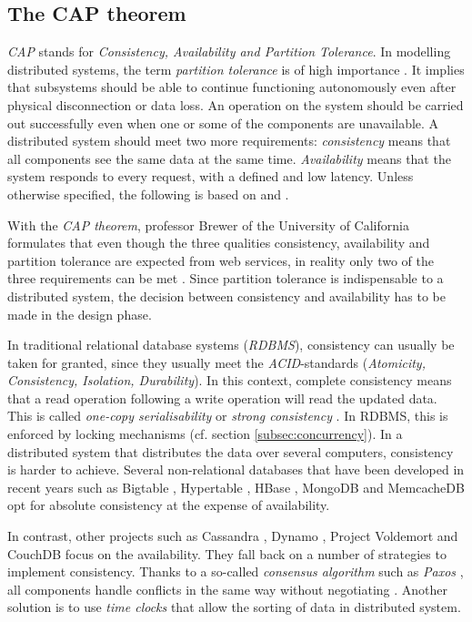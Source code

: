 \subsection{The CAP theorem}
\label{subsec:cap}

\textit{CAP} stands for \textit{Consistency, Availability and Partition Tolerance}. In modelling distributed systems, the term \textit{partition tolerance} is of high importance . It implies that subsystems should be able to continue functioning autonomously even after physical disconnection or data loss. An operation on the system should be carried out successfully even when one or some of the components are unavailable. A distributed system should meet two more requirements: \textit{consistency} means that all components see the same data at the same time. \textit{Availability} means that the system responds to every request, with a defined and low latency. Unless otherwise specified, the following is based on  and .

With the \textit{CAP theorem}, professor Brewer of the University of California formulates that even though the three qualities consistency, availability and partition tolerance are expected from web services, in reality only two of the three requirements can be met . Since partition tolerance is indispensable to a distributed system, the decision between consistency and availability has to be made in the design phase.

In traditional relational database systems (\textit{RDBMS}), consistency can usually be taken for granted, since they usually meet the \textit{ACID}-standards (\textit{Atomicity, Consistency, Isolation, Durability}). In this context, complete consistency means that a read operation following a write operation will read the updated data. This is called \textit{one-copy serialisability} or \textit{strong consistency} . In RDBMS, this is enforced by locking mechanisms (cf. section \ref{subsec:concurrency}). In a distributed system that distributes the data over several computers, consistency is harder to achieve. Several non-relational databases that have been developed in recent years such as Bigtable , Hypertable \cite{hypertable:website}, HBase \cite{hbase:website}, MongoDB \cite{mongodb:website} and MemcacheDB \cite{memcacheDB:website} opt for absolute consistency at the expense of availability.

In contrast, other projects such as Cassandra \cite{cassandra:website}, Dynamo \cite{dynamo:website}, Project Voldemort \cite{voldemort:website} and CouchDB focus on the availability. They fall back on a number of strategies to implement consistency. Thanks to a so-called \textit{consensus algorithm} such as \textit{Paxos} , all components handle conflicts in the same way without negotiating . Another solution is to use \textit{time clocks} that allow the sorting of data in distributed system.

